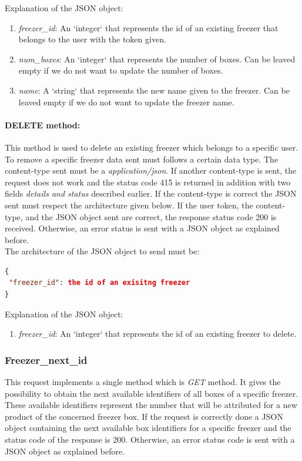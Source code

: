 Explanation of the  JSON object:
\begin{enumerate}
\item \textit{freezer\_id}: An `integer` that represents the id of an existing freezer that belongs to the user with the token given.
\item \textit{num\_boxes}: An `integer` that represents the number of boxes. Can be leaved empty if we do not want to update the number of boxes.
\item \textit{name}: A `string` that represents the new name given to the freezer. Can be leaved empty if we do not want to update the freezer name.
\end{enumerate}

\paragraph{DELETE method:} This method is used to delete an existing freezer which belongs to a specific user. To remove a specific freezer data sent must follows a certain data type.  The content-type sent must be a \textit{application/json}. If another content-type is sent, the request does not work and the status code 415 is returned in addition with two fields \textit{details and status} described earlier. If the content-type is correct the JSON sent must respect the architecture given below. If the user token, the content-type, and the JSON object sent are correct, the response status code 200 is received. Otherwise, an error status is sent with a JSON object as explained before.\\

The architecture of the JSON object to send must be:
\begin{lstlisting}[language=json]
{
 "freezer_id": the id of an exisitng freezer
}
\end{lstlisting}

Explanation of the  JSON object:
\begin{enumerate}
\item \textit{freezer\_id}: An `integer` that represents the id of an existing freezer to delete.
\end{enumerate}

\subsubsection{Freezer\_next\_id}
This request implements a single method which is \textit{GET} method. It gives the possibility to obtain the next available identifiers of all boxes of a specific freezer. These available identifiers represent the number that will be attributed for a new product of the concerned freezer box. If the request is correctly done a JSON object containing the next available box identifiers for a specific freezer and the status code of the response is 200. Otherwise, an error status code is sent with a JSON object as explained before.\\

